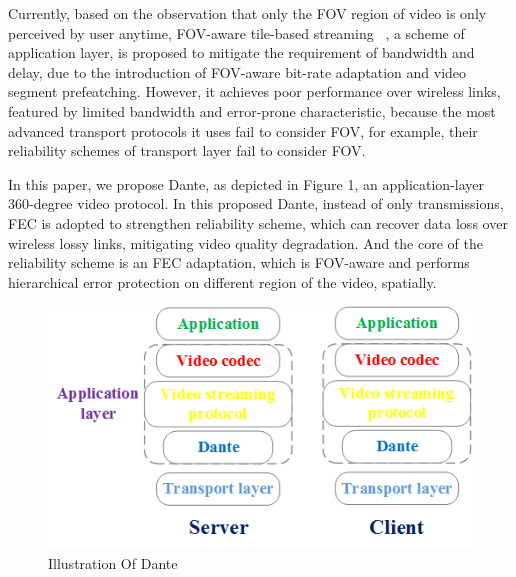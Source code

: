 Currently, based on the observation that only the FOV region of video is only perceived by user anytime, FOV-aware tile-based streaming~\cite{Viewport-adaptive}\cite{360ProbDASH}\cite{Adaptive_Streaming_Framework} \cite{Two-tier}\cite{Omnidirectional_Video_over_HTTP}\cite{Furion}, a scheme of application layer, is proposed to mitigate the requirement of bandwidth and delay, due to the introduction of FOV-aware bit-rate adaptation and video segment prefeatching. However, it achieves poor performance over wireless links, featured by limited bandwidth and error-prone characteristic, because the most advanced transport protocols it uses fail to consider FOV, for example, their reliability schemes of transport layer fail to consider FOV.     

In this paper, we propose Dante, as depicted in Figure 1, an application-layer 360-degree video protocol.
In this proposed Dante, instead of only transmissions, FEC is adopted to strengthen reliability scheme, which can recover data loss over wireless lossy links, mitigating video quality degradation. 
And the core of the reliability scheme is an FEC adaptation, which is FOV-aware and performs hierarchical error protection on different region of the video, spatially.


\begin{figure}[ht]
	\centering
	\includegraphics[scale=0.4]{paper_figs/stack_dante.png}
	\caption{Illustration Of Dante}
	\label{paper_figs:pathdemo}
\end{figure}

